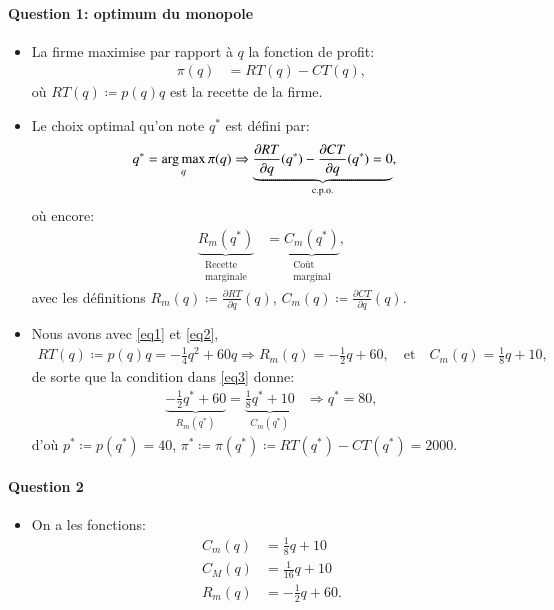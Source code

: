 \documentclass[notes, ignorenonframetext, compress, 9pt, xcolor=svgnames, aspectratio=169]{beamer}
\begin{document}
\begin{frame}
[allowframebreaks]{\insertsection}
\framesubtitle{Question 1: optimum du monopole}
\begin{itemize}
\item La firme maximise par rapport à $q$  la fonction de profit:
\begin{align}
\pi(q) &= RT(q) - CT(q),
\label{eq3}
\end{align}
où $RT(q) \coloneqq p(q)q$ est la recette de la firme. 
\item Le choix optimal qu'on note $q^*$  est défini par:
\begin{align}
q^* &=\argmax_q \pi(q) \Rightarrow \underbrace{\frac{\partial RT}{\partial q}(q^*) -  \frac{\partial CT}{\partial q}(q^*) = 0}_{\text{c.p.o.}}, 
\label{eq3}
\end{align}
où encore:
\begin{align*}
\underbrace{R_m(q^*)}_{\substack{\text{Recette} \\ \text{marginale}}} &= \underbrace{C_m(q^*)}_{\substack{\text{Coût} \\ \text{marginal}}}, 
\end{align*}
avec les définitions $R_m(q)\coloneqq \frac{\partial RT}{\partial q}(q)$,  $C_m(q)\coloneqq \frac{\partial CT}{\partial q}(q)$.

\item Nous avons avec \eqref{eq1} et \eqref{eq2},
\begin{align*}
RT(q) \coloneqq p(q) q=  -\frac{1}{4}q^2 + 60q \Rightarrow R_m(q) = -\frac{1}{2}q + 60, \quad \text{et} \quad C_m(q) = \frac{1}{8}q + 10,
\end{align*}
de sorte que la condition dans \eqref{eq3} donne:
\begin{align*}
\underbrace{-\frac{1}{2}q^* + 60}_{R_m(q^*)} = \underbrace{ \frac{1}{8}q^* + 10}_{C_m(q^*)}  &\Rightarrow q^* = 80,
\end{align*}
d'où $p^* \coloneqq p(q^*) =  40$, $\pi^* \coloneqq \pi(q^*) \coloneqq RT(q^*) - CT(q^*) =2000 $.
\end{itemize}
\end{frame}
\begin{frame}
  [allowframebreaks]{\insertsection}
  \framesubtitle{Question 2}
  \begin{itemize}
   \item On a les fonctions:
   \begin{align*}
    C_m(q) &= \frac{1}{8}q + 10\\
    C_M(q) &= \frac{1}{16}q + 10\\
    R_m(q) &= -\frac{1}{2}q + 60.
   \end{align*}
  \end{itemize}
\end{frame} 
\end{document}
